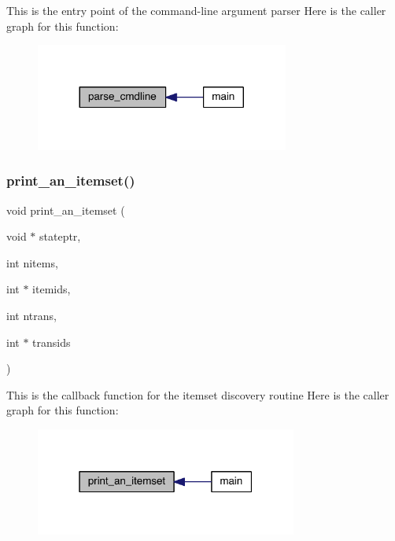 This is the entry point of the command-\/line argument parser Here is the caller graph for this function\+:\nopagebreak
\begin{figure}[H]
\begin{center}
\leavevmode
\includegraphics[width=236pt]{a00146_aea2aa8c9b5bb7c64a3f316d7760f0341_icgraph}
\end{center}
\end{figure}
\mbox{\label{a00146_a3b3cc293672156bbc5026fd567f52462}} 
\subsubsection{\texorpdfstring{print\+\_\+an\+\_\+itemset()}{print\_an\_itemset()}}
{\footnotesize\ttfamily void print\+\_\+an\+\_\+itemset (\begin{DoxyParamCaption}\item[{void $\ast$}]{stateptr,  }\item[{int}]{nitems,  }\item[{int $\ast$}]{itemids,  }\item[{int}]{ntrans,  }\item[{int $\ast$}]{transids }\end{DoxyParamCaption})}

This is the callback function for the itemset discovery routine Here is the caller graph for this function\+:\nopagebreak
\begin{figure}[H]
\begin{center}
\leavevmode
\includegraphics[width=244pt]{a00146_a3b3cc293672156bbc5026fd567f52462_icgraph}
\end{center}
\end{figure}
\mbox{\label{a00146_a702976a4c55992ddbfc1918ec1b70943}} 
